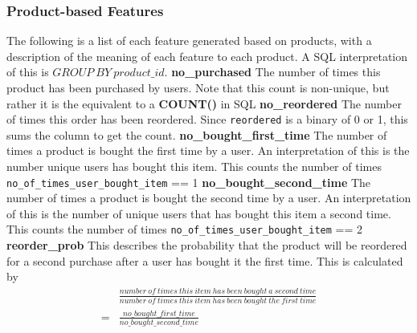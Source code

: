 \documentclass[12pt]{article}
\begin{document}
\subsubsection{Product-based Features} \label{product_features}
The following is a list of each feature generated based on products, with a description of the meaning of each feature to each product. A SQL interpretation of this is $GROUP\ BY\ product\_id$.
\newline\newline
{\textbf{no\_purchased}}
\newline
The number of times this product has been purchased by users. Note that this count is non-unique, but rather it is the equivalent to a \textbf{COUNT()} in SQL
\newline\newline
{\textbf{no\_reordered}}
\newline
The number of times this order has been reordered. Since \texttt{reordered} is a binary of 0 or 1, this sums the column to get the count.
\newline\newline
{\textbf{no\_bought\_first\_time}}
\newline
The number of times a product is bought the first time by a user. An interpretation of this is the number unique users has bought this item. This counts the number of times \texttt{no\_of\_times\_user\_bought\_item} == 1
\newline\newline
{\textbf{no\_bought\_second\_time}}
\newline
The number of times a product is bought the second time by a user. An interpretation of this is the number of unique users that has bought this item a second time. This counts the number of times \texttt{no\_of\_times\_user\_bought\_item} == 2
\newline\newline
{\textbf{reorder\_prob}}
\newline
This describes the probability that the product will be reordered for a second purchase after a user has bought it the first time. This is calculated by
\begin{equation}
    \begin{split}
        &\frac
        {number\ of\ times\ this\ item\ has\ been\ bought\ a\ second\ time}
        {number\ of\ times\ this\ item\ has\ been\ bought\ the\ first\ time}\\
        = &\frac
        {no\_bought\_first\_time}
        {no\_bought\_second\_time}
    \end{split}
\end{equation}
\end{document}
